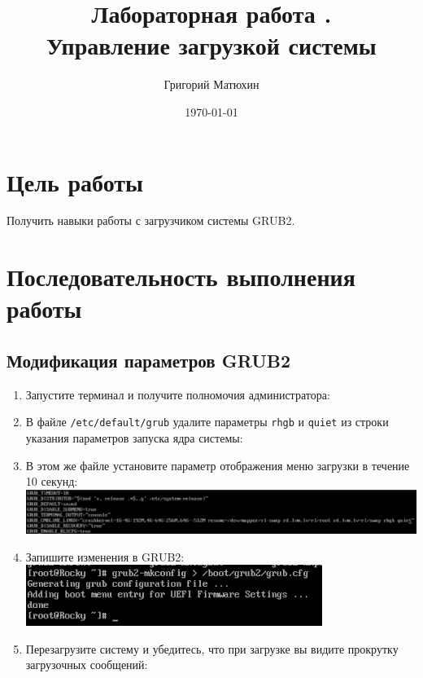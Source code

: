\documentclass[12pt]{article}
\author{Григорий Матюхин}
\date{\today}
\title{Лабораторная работа \textnumero11.\\Управление загрузкой системы}
\begin{document}
\maketitle
\newpage
\tableofcontents
\newpage
\section{Цель работы}
Получить навыки работы с загрузчиком системы GRUB2.

\section{Последовательность выполнения работы}

\subsection{Модификация параметров GRUB2}
\begin{enumerate}
	\item Запустите терминал и получите полномочия администратора:
	\item В файле \texttt{/etc/default/grub} удалите параметры \texttt{rhgb} и \texttt{quiet} из строки указания параметров запуска ядра системы:
	\item В этом же файле установите параметр отображения меню загрузки в течение 10 секунд:
	      \\\includegraphics{1.png}
	\item Запишите изменения в GRUB2:
	      \\\includegraphics{2.png}
	\item Перезагрузите систему и убедитесь, что при загрузке вы видите прокрутку загрузочных сообщений:
\end{enumerate}
\end{document}
